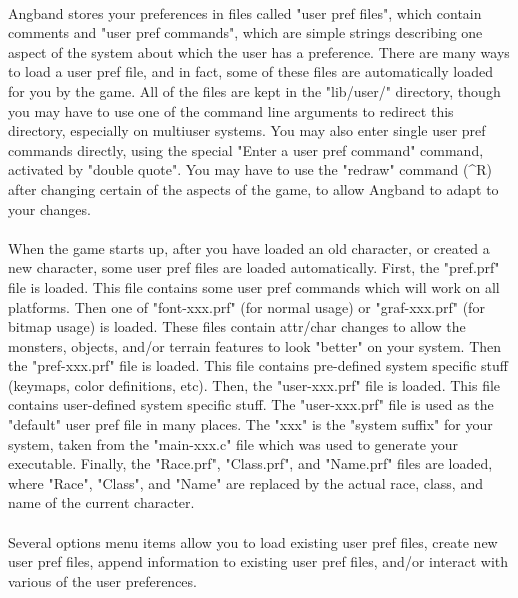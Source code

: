 \paragraph{}Angband stores your preferences in files called "user pref files",
which contain comments and "user pref commands", which are simple strings
describing one aspect of the system about which the user has a preference.
There are many ways to load a user pref file, and in fact, some of these
files are automatically loaded for you by the game. All of the files are
kept in the "lib/user/" directory, though you may have to use one of the
command line arguments to redirect this directory, especially on multiuser
systems. You may also enter single user pref commands directly, using the
special "Enter a user pref command" command, activated by "double quote".
You may have to use the "redraw" command (\^{}R) after changing certain of
the aspects of the game, to allow Angband to adapt to your changes.

\paragraph{}When the game starts up, after you have loaded an old character,
or created a new character, some user pref files are loaded automatically.
First, the "pref.prf" file is loaded. This file contains some user pref
commands which will work on all platforms. Then one of "font-xxx.prf"
(for normal usage) or "graf-xxx.prf" (for bitmap usage) is loaded. These
files contain attr/char changes to allow the monsters, objects, and/or
terrain features to look "better" on your system. Then the "pref-xxx.prf"
file is loaded. This file contains pre-defined system specific stuff
(keymaps, color definitions, etc). Then, the "user-xxx.prf" file is loaded.
This file contains user-defined system specific stuff. The "user-xxx.prf"
file is used as the "default" user pref file in many places. The "xxx" is
the "system suffix" for your system, taken from the "main-xxx.c" file which
was used to generate your executable. Finally, the "Race.prf", "Class.prf",
and "Name.prf" files are loaded, where "Race", "Class", and "Name" are
replaced by the actual race, class, and name of the current character.

\paragraph{}Several options menu items allow you to load existing user
pref files, create new user pref files, append information to existing
user pref files, and/or interact with various of the user preferences.

